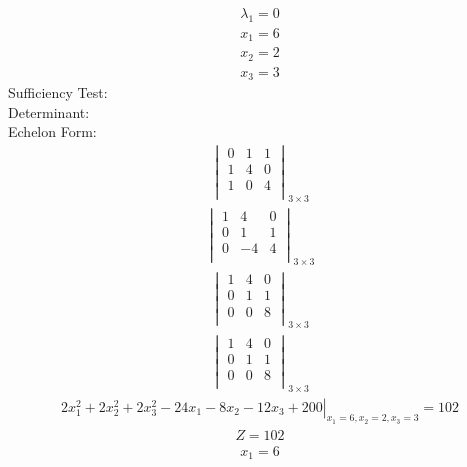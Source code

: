 \documentclass{article}
\begin{document}
\begin{align*}
\lambda_{1}=0\end{align*}
\begin{align*}
x_{1}=6\end{align*}
\begin{align*}
x_{2}=2\end{align*}
\begin{align*}
x_{3}=3\end{align*}
Sufficiency Test:\\
Determinant:\\
Echelon Form:\\
\begin{align*}
\begin{vmatrix}
0 & 1 & 1\\
1 & 4 & 0\\
1 & 0 & 4\\
\end{vmatrix}_{3\times 3}
\end{align*}
\begin{align*}
\begin{vmatrix}
1 & 4 & 0\\
0 & 1 & 1\\
0 & -4 & 4\\
\end{vmatrix}_{3\times 3}
\end{align*}
\begin{align*}
\begin{vmatrix}
1 & 4 & 0\\
0 & 1 & 1\\
0 & 0 & 8\\
\end{vmatrix}_{3\times 3}
\end{align*}
\begin{align*}
\begin{vmatrix}
1 & 4 & 0\\
0 & 1 & 1\\
0 & 0 & 8\\
\end{vmatrix}_{3\times 3}
\end{align*}
\begin{align*}
\left.2x_{1}^{2} + 2x_{2}^{2} + 2x_{3}^{2} - 24x_{1} - 8x_{2} - 12x_{3} + 200\right|_{x_{1}=6,x_{2}=2,x_{3}=3}=102\end{align*}
\begin{align*}
Z=102\end{align*}
\begin{align*}
x_{1}=6\end{align*}
\end{document}
